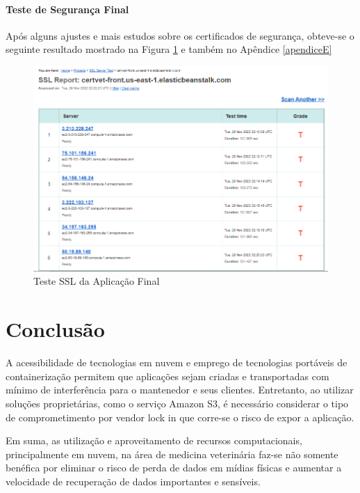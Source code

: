 \documentclass[
    12pt,               %
    openright,          %
    oneside,
    a4paper,            %
    BIBLATEX,           %
    TODO,               %
    english,            %
    brazil              %
    ]{ifsp-spo-inf-ctds}
\begin{document}
    \subsubsection{Teste de Segurança Final}

    Após alguns ajustes e mais estudos sobre os certificados de segurança, obteve-se o seguinte resultado mostrado na Figura \ref{fig:sslFrontfinal} e também no Apêndice \ref{apendiceE}

    \begin{figure}[H]
        \centering
        \includegraphics[width=0.9 \textwidth]{images/sslFront.png}
        \caption{Teste SSL da Aplicação Final}
        \label{fig:sslFrontfinal}
    \end{figure}


\chapter[Conclusão]{Conclusão}

    A acessibilidade de tecnologias em nuvem e emprego de tecnologias portáveis de containerização permitem que aplicações sejam criadas e transportadas com mínimo de interferência para o mantenedor e seus clientes. Entretanto, ao utilizar soluções proprietárias, como o serviço Amazon S3, é necessário considerar o tipo de comprometimento por vendor lock in que corre-se o risco de expor a aplicação.

    Em suma, as utilização e aproveitamento de recursos computacionais, principalmente em nuvem, na área de medicina veterinária faz-se não somente benéfica por eliminar o risco de perda de dados em mídias físicas e aumentar a velocidade de recuperação de dados importantes e sensíveis.
\end{document}
